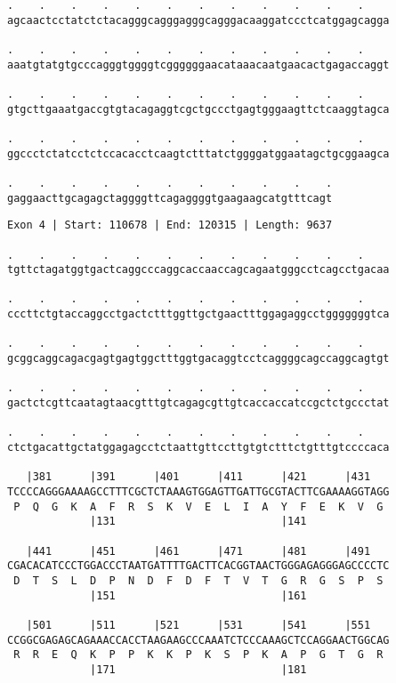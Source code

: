 \documentclass{article}
\begin{document}
\begin{Verbatim}
.    .    .    .    .    .    .    .    .    .    .    .    
agcaactcctatctctacagggcagggagggcagggacaaggatccctcatggagcagga
  
.    .    .    .    .    .    .    .    .    .    .    .    
aaatgtatgtgcccagggtggggtcggggggaacataaacaatgaacactgagaccaggt
  
.    .    .    .    .    .    .    .    .    .    .    .    
gtgcttgaaatgaccgtgtacagaggtcgctgccctgagtgggaagttctcaaggtagca
  
.    .    .    .    .    .    .    .    .    .    .    .    
ggccctctatcctctccacacctcaagtctttatctggggatggaatagctgcggaagca
  
.    .    .    .    .    .    .    .    .    .    .
gaggaacttgcagagctaggggttcagaggggtgaagaagcatgtttcagt
\end{Verbatim}
\newpage
\begin{Verbatim}
Exon 4 | Start: 110678 | End: 120315 | Length: 9637
 
.    .    .    .    .    .    .    .    .    .    .    .    
tgttctagatggtgactcaggcccaggcaccaaccagcagaatgggcctcagcctgacaa
  
.    .    .    .    .    .    .    .    .    .    .    .    
cccttctgtaccaggcctgactctttggttgctgaactttggagaggcctgggggggtca
  
.    .    .    .    .    .    .    .    .    .    .    .    
gcggcaggcagacgagtgagtggctttggtgacaggtcctcaggggcagccaggcagtgt
  
.    .    .    .    .    .    .    .    .    .    .    .    
gactctcgttcaatagtaacgtttgtcagagcgttgtcaccaccatccgctctgccctat
  
.    .    .    .    .    .    .    .    .    .    .    .    
ctctgacattgctatggagagcctctaattgttccttgtgtctttctgtttgtccccaca
  
   |381      |391      |401      |411      |421      |431   
TCCCCAGGGAAAAGCCTTTCGCTCTAAAGTGGAGTTGATTGCGTACTTCGAAAAGGTAGG
 P  Q  G  K  A  F  R  S  K  V  E  L  I  A  Y  F  E  K  V  G 
             |131                          |141             
  
   |441      |451      |461      |471      |481      |491   
CGACACATCCCTGGACCCTAATGATTTTGACTTCACGGTAACTGGGAGAGGGAGCCCCTC
 D  T  S  L  D  P  N  D  F  D  F  T  V  T  G  R  G  S  P  S 
             |151                          |161             
  
   |501      |511      |521      |531      |541      |551   
CCGGCGAGAGCAGAAACCACCTAAGAAGCCCAAATCTCCCAAAGCTCCAGGAACTGGCAG
 R  R  E  Q  K  P  P  K  K  P  K  S  P  K  A  P  G  T  G  R 
             |171                          |181             
  

\end{Verbatim}
\end{document}
